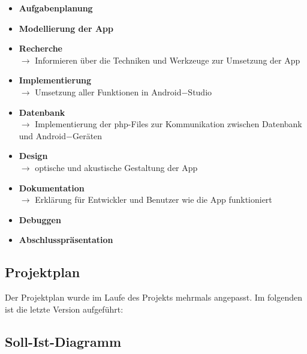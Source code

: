 \documentclass[12pt, a4paper]{article}
\begin{document}
\begin{itemize}

\item \textbf{Aufgabenplanung}   


\item \textbf{Modellierung der App} 

\item \textbf{Recherche} \\
$\rightarrow$ Informieren über die Techniken und Werkzeuge zur Umsetzung der App

\item \textbf{Implementierung} \\
$\rightarrow$ Umsetzung aller Funktionen in Android$-$Studio

\item \textbf{Datenbank} \\
$\rightarrow$ Implementierung der php-Files zur Kommunikation zwischen Datenbank und Android$-$Geräten

\item \textbf{Design} \\
$\rightarrow$ optische und akustische Gestaltung der App

\item \textbf{Dokumentation} \\
$\rightarrow$ Erklärung für Entwickler und Benutzer wie die App funktioniert

\item \textbf{Debuggen} 

\item \textbf{Abschlusspräsentation} 

\end{itemize}
		

	\subsection{Projektplan}

Der Projektplan wurde im Laufe des Projekts mehrmals angepasst. Im folgenden ist die letzte Version aufgeführt: 




	\subsection{Soll-Ist-Diagramm} 
\end{document}
